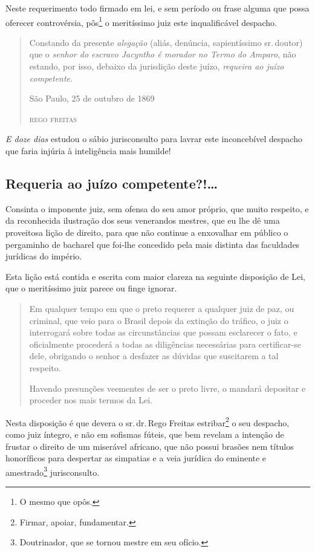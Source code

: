 Neste requerimento todo firmado em lei, e sem período ou frase alguma
que possa oferecer controvérsia, pôs\footnote{O mesmo que opôs.} o
meritíssimo juiz este inqualificável despacho.

\begin{quote}
Constando da presente \emph{alegação} (aliás, denúncia, sapientíssimo
sr.\,doutor) que o \emph{senhor do escravo Jacyntho é morador no Termo do
Amparo}, não estando, por isso, debaixo da jurisdição deste juízo,
\emph{requeira ao juízo competente}.

\begin{flushright}
São Paulo, 25 de outubro de 1869

\textsc{rego freitas}
\end{flushright}
\end{quote}

\emph{E doze dias} estudou o sábio jurisconsulto para lavrar este
inconcebível despacho que faria injúria à inteligência mais humilde!

\subsection{Requeria ao juízo competente?!\ldots{}}

Consinta o imponente juiz, sem ofensa do seu amor próprio, que muito
respeito, e da reconhecida ilustração dos seus venerandos mestres, que
eu lhe dê uma proveitosa lição de direito, para que não continue a
enxovalhar em público o pergaminho de bacharel que foi-lhe concedido
pela mais distinta das faculdades jurídicas do império.

Esta lição está contida e escrita com maior clareza na seguinte
disposição de Lei, que o meritíssimo juiz parece ou finge ignorar.

\begin{quote}
Em qualquer tempo em que o preto requerer a qualquer juiz de paz, ou
criminal, que veio para o Brasil depois da extinção do tráfico, o juiz o
interrogará sobre todas as circunstâncias que possam esclarecer o fato,
e oficialmente procederá a todas as diligências necessárias para
certificar-se dele, obrigando o senhor a desfazer as dúvidas que
suscitarem a tal respeito.

Havendo presunções veementes de ser o preto livre, o mandará depositar e
proceder nos mais termos da Lei.
\end{quote}

Nesta disposição é que devera o sr.\,dr.\,Rego Freitas estribar\footnote{
  Firmar, apoiar, fundamentar.} o seu despacho, como juiz íntegro, e não
em sofismas fúteis, que bem revelam a intenção de frustar o direito de
um miserável africano, que não possui brasões nem títulos honoríficos
para despertar as simpatias e a veia jurídica do eminente e
amestrado\footnote{Doutrinador, que se tornou mestre em seu ofício.}
jurisconsulto.

